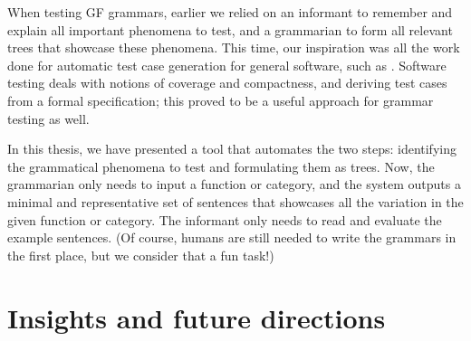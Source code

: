 When testing GF grammars, earlier we relied on an informant to
remember and explain all important phenomena to test, and a grammarian
to form all relevant trees that showcase these phenomena.  This time,
our inspiration was all the work done for automatic test case
generation for general software, such as
\citet{celentano1980compiler,Geist1996,QuickCheck}. Software testing
deals with notions of coverage and compactness, and deriving test
cases from a formal specification; this proved to be a useful approach
for grammar testing as well.

In this thesis, we have presented a tool that automates the two steps:
identifying the grammatical phenomena to test and formulating them as
trees. Now, the grammarian only needs to input a function or category,
and the system outputs a minimal and representative set of sentences
that showcases all the variation in the given function or
category. The informant only needs to read and evaluate the example
sentences.  (Of course, humans are still needed to write the grammars
in the first place, but we consider that a fun task!)

%



\section{Insights and future directions}

